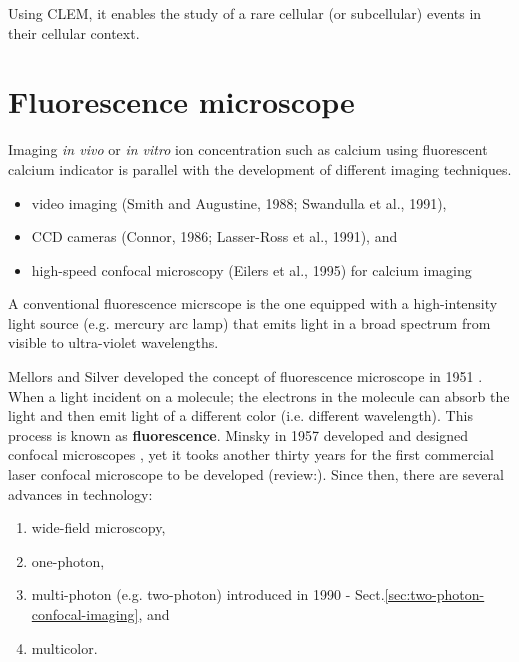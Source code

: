 Using CLEM, it enables the study of a rare  cellular 
(or subcellular) events in their cellular context. 

\section{Fluorescence microscope}
\label{sec:fluorecence_microscope}

Imaging {\it in vivo} or {\it in vitro} ion concentration such as calcium
using fluorescent calcium indicator is parallel with the development of
different imaging techniques.
\begin{itemize}
  \item  video imaging (Smith and Augustine, 1988; Swandulla et al., 1991), 
  
  \item CCD cameras (Connor, 1986; Lasser-Ross et al., 1991), and 
  
  \item high-speed confocal microscopy (Eilers et al., 1995) for calcium imaging
\end{itemize}

A conventional fluorescence micrscope is the one equipped with a high-intensity
light source (e.g. mercury arc lamp) that emits light in a broad spectrum from
visible to ultra-violet wavelengths.

Mellors and Silver developed the concept of fluorescence microscope in 1951
\citep{mellors1951}. When a light incident on a molecule; the electrons
in the molecule can absorb the light and then emit light of a different color
(i.e. different wavelength). This process is known as {\bf fluorescence}. Minsky
in 1957 developed and designed confocal microscopes \citep{minsky1957}, yet it tooks
another thirty years for the first commercial laser confocal microscope to be
developed (review:\citep{pawley2006}). Since then, there are several advances in
technology: 
\begin{enumerate}
  \item  wide-field microscopy, 
  
  \item one-photon, 
  
  \item multi-photon (e.g. two-photon) introduced in 1990 -
  Sect.\ref{sec:two-photon-confocal-imaging}, and
  
  \item multicolor.
\end{enumerate} 

